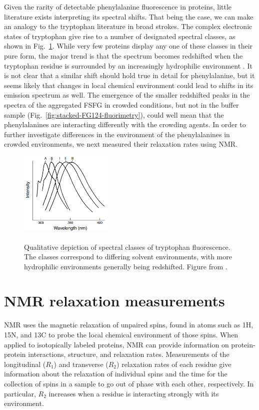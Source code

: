 Given the rarity of detectable phenylalanine fluorescence in proteins, little literature exists interpreting its spectral shifts.  That being the case, we can make an analogy to the tryptophan literature in broad strokes.   The complex electronic states of tryptophan give rise to a number of designated spectral classes, as shown in Fig.~\ref{fig:tryptophan}.  While very few proteins display any one of these classes in their pure form, the major trend is that the spectrum becomes redshifted when the tryptophan residue is surrounded by an increasingly hydrophilic environment \cite{ladokhin00,serrano-andres96}.  It is not clear that a similar shift should hold true in detail for phenylalanine, but it seems likely that changes in local chemical environment could lead to shifts in its emission spectrum as well.  The emergence of the smaller redshifted peaks in the spectra of the aggregated FSFG in crowded conditions, but not in the buffer sample (Fig.~\ref{fig:stacked-FG124-fluorimetry}), could well mean that the phenylalanines are interacting differently with the crowding agents.   In order to further investigate differences in the environment of the phenylalanines in crowded environments, we next measured their relaxation rates using NMR.

\begin{figure}
\caption[Classes of tryptophan fluorescence.]{Qualitative depiction of spectral classes of tryptophan fluorescence. The classes correspond to differing solvent environments, with more hydrophilic environments generally being redshifted.  Figure from \cite{ladokhin00}.}
\centering
\includegraphics[width=0.4\textwidth]{figs/ch05/trytophan-ladokhin.png}
\label{fig:tryptophan}
\end{figure}


\section{NMR relaxation measurements}

NMR uses the magnetic relaxation of unpaired spins, found in atoms such as 1H, 15N, and 13C to probe the local chemical environment of those spins.  When applied to isotopically labeled proteins, NMR can provide information on protein-protein interactions, structure, and relaxation rates.  Measurements of the longitudinal ($R_1$) and transverse ($R_2$) relaxation rates of each residue give information about the relaxation of individual spins and the time for the collection of spins in a sample to go out of phase with each other, respectively.  In particular, $R_2$ increases when a residue is interacting strongly with its environment.

